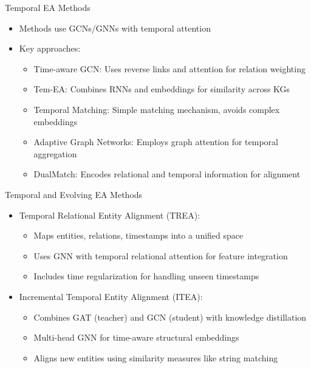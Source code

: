 \documentclass{beamer}
\begin{document}
    \begin{frame}{Temporal EA Methods}
        \begin{itemize}
            \item Methods use GCNs/GNNs with temporal attention
            \item Key approaches:
            \begin{itemize}
                \item Time-aware GCN: Uses reverse links and attention for relation weighting
                \item Tem-EA: Combines RNNs and embeddings for similarity across KGs
                \item Temporal Matching: Simple matching mechanism, avoids complex embeddings
                \item Adaptive Graph Networks: Employs graph attention for temporal aggregation
                \item DualMatch: Encodes relational and temporal information for alignment
            \end{itemize}
        \end{itemize}
    \end{frame}

    \begin{frame}{Temporal and Evolving EA Methods}
        \begin{itemize}
           \item Temporal Relational Entity Alignment (TREA):
            \begin{itemize}
                \item Maps entities, relations, timestamps into a unified space
                \item Uses GNN with temporal relational attention for feature integration
                \item Includes time regularization for handling unseen timestamps
            \end{itemize}
            \item Incremental Temporal Entity Alignment (ITEA):
            \begin{itemize}
                \item Combines GAT (teacher) and GCN (student) with knowledge distillation
                \item Multi-head GNN for time-aware structural embeddings
                \item Aligns new entities using similarity measures like string matching
            \end{itemize}
        \end{itemize}
    \end{frame}
\end{document}
